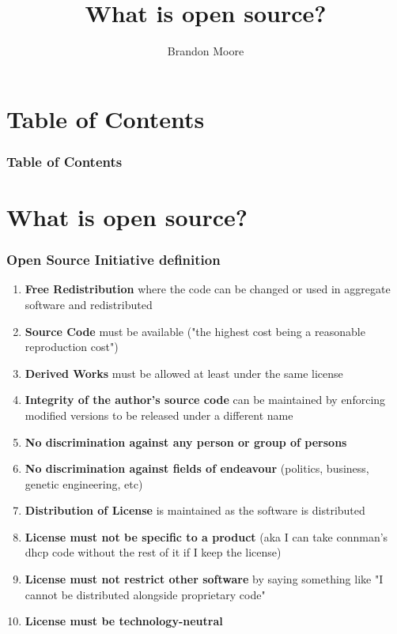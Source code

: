 \documentclass[8pt]{beamer}
\title{What is open source?}
\author{Brandon Moore}
\begin{document}
\begin{frame}
	\titlepage
\end{frame}

\section{Table of Contents}
\begin{frame}
	\frametitle{Table of Contents}
	\tableofcontents[]
\end{frame}

\section{What is open source?}
\begin{frame}
	\frametitle{Open Source Initiative definition}
	\begin{enumerate}
		\item \textbf{Free Redistribution} where the code can be changed or used in aggregate software and redistributed
		\item \textbf{Source Code} must be available ("the highest cost being a reasonable reproduction cost")
		\item \textbf{Derived Works} must be allowed at least under the same license
		\item \textbf{Integrity of the author's source code} can be maintained by enforcing modified versions to be released under a different name
		\item \textbf{No discrimination against any person or group of persons}
		\item \textbf{No discrimination against fields of endeavour} (politics, business, genetic engineering, etc)
		\item \textbf{Distribution of License} is maintained as the software is distributed
		\item \textbf{License must not be specific to a product} (aka I can take connman's dhcp code without the rest of it if I keep the license)
		\item \textbf{License must not restrict other software} by saying something like "I cannot be distributed alongside proprietary code"
		\item \textbf{License must be technology-neutral}
	\end{enumerate}
\end{frame}
\end{document}
